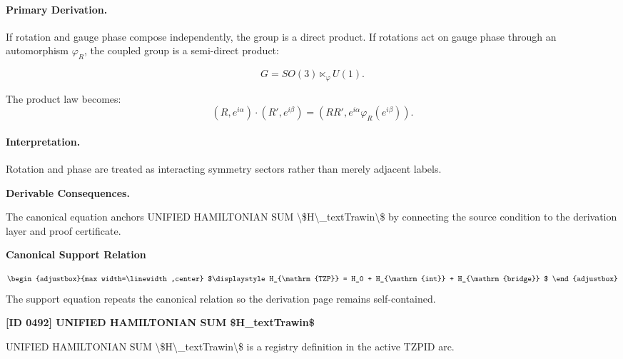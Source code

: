 \paragraph{Primary Derivation.}
If rotation and gauge phase compose independently, the group is a direct product.  
If rotations act on gauge phase through an automorphism $\varphi_R$, the coupled group is a semi-direct product:

\begin{equation}
G=SO(3)\ltimes_{\varphi}U(1).
\end{equation}

The product law becomes:
\begin{equation}
\boxed{
(R,e^{i\alpha})\cdot(R',e^{i\beta})
=
\left(
RR',
e^{i\alpha}\varphi_R(e^{i\beta})
\right).
}
\end{equation}

\paragraph{Interpretation.}
Rotation and phase are treated as interacting symmetry sectors rather than merely adjacent labels.

\par\vspace{0.35em}
\noindent\textbf{Derivable Consequences.}\quad
\begingroup
\footnotesize
\raggedright
The canonical equation anchors UNIFIED HAMILTONIAN SUM \textbackslash{}\$H\textbackslash{}\_textTrawin\textbackslash{}\$ by connecting the source condition to the derivation layer and proof certificate.
\par\endgroup

\noindent\textbf{Canonical Support Relation}\par
\[
\begin{adjustbox}{max width=\linewidth,center}
$\displaystyle
H_{\mathrm{TZP}} = H_0 + H_{\mathrm{int}} + H_{\mathrm{bridge}}
$
\end{adjustbox}
\]
\noindent The support equation repeats the canonical relation so the derivation page remains self-contained.\par

\clearpage
\noindent\textbf{[ID 0492] UNIFIED HAMILTONIAN SUM \$H\_textTrawin\$}\par
\vspace{0.35em}
\begingroup\small
{}
UNIFIED HAMILTONIAN SUM \textbackslash{}\$H\textbackslash{}\_textTrawin\textbackslash{}\$ is a registry definition in the active TZPID arc.

